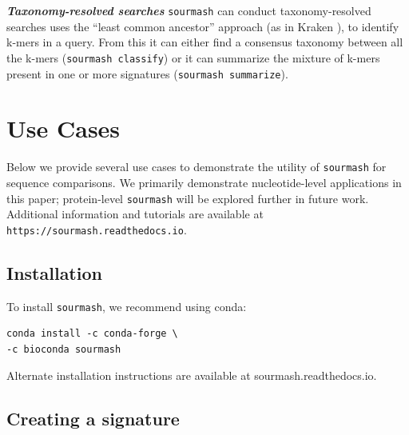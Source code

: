 \documentclass[10pt,a4paper,twocolumn]{article}
\begin{document}
\textit{\textbf{Taxonomy-resolved searches}}
\lstinline{sourmash} can conduct taxonomy-resolved searches uses the “least common ancestor” approach (as in Kraken \cite{wood2014kraken}), to identify k-mers in a query. From this it can either find a consensus taxonomy between all the k-mers (\lstinline{sourmash classify}) or it can summarize the mixture of k-mers present in one or more signatures (\lstinline{sourmash summarize}).


\section*{Use Cases}

Below we provide several use cases to demonstrate the utility of \lstinline{sourmash} for sequence comparisons. We primarily demonstrate nucleotide-level applications in this paper; protein-level \lstinline{sourmash} will be explored further in future work. Additional information and tutorials are available at \lstinline{https://sourmash.readthedocs.io}.

\subsection*{Installation}

To install \lstinline{sourmash}, we recommend using conda:

\begin{lstlisting}
conda install -c conda-forge \
-c bioconda sourmash
\end{lstlisting}


Alternate installation instructions are available at sourmash.readthedocs.io. 

\subsection*{Creating a signature}
\end{document}
